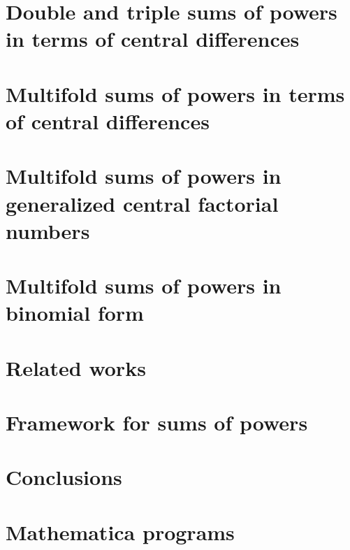 \documentclass[12pt,letterpaper,oneside,reqno]{amsart}
\begin{document}
\section{Double and triple sums of powers in terms of central differences}


\section{Multifold sums of powers in terms of central differences}


\section{Multifold sums of powers in generalized central factorial numbers}


\section{Multifold sums of powers in binomial form}


\section{Related works}


\section{Framework for sums of powers}


\section{Conclusions}





\clearpage

\section{Mathematica programs}



% 
\end{document}
